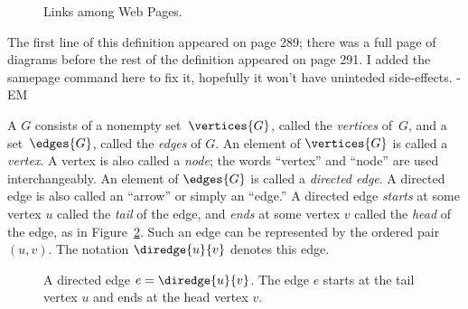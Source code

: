 \iffalse

and in the following graph the vertices $x_1, \ldots, x_n$ correspond
to web pages and $\diredge{x_i}{x_j}$ is a directed edge when page
$x_i$ contains a hyperlink to page $x_j$.
\fi


\begin{figure}


\caption{Links among Web Pages.}

\label{webpage-links}

\end{figure}
\begin{editingnotes}

The first line of this definition appeared on page 289; there was a
full page of diagrams before the rest of the definition appeared on
page 291. I added the samepage command here to fix it, hopefully it
won't have uninteded side-effects. -EM
\end{editingnotes}

\begin{samepage}
\begin{definition}\label{graphdef}
  A  $G$ consists of a nonempty
  set~$\vertices{G}$, called the \emph{vertices}%
of~$G$, and a set~$\edges{G}$, called the \emph{edges}%
of $G$.  An element of
  $\vertices{G}$ is called a \emph{vertex}.  A vertex is also called a
  \emph{node}; the words ``vertex'' and ``node'' are used
  interchangeably.  An element of $\edges{G}$ is called a
  \emph{directed edge}.  A directed edge is also called an ``arrow''
  or simply an ``edge.''  A directed edge \emph{starts} 
at some vertex $u$ called the \emph{tail}
  of the edge, and \emph{ends} at some vertex
  $v$ called the \emph{head} of the edge, as in Figure~\ref{fig:6EA}.
  Such an edge can be represented by the ordered pair $(u,v)$.  The
  notation $\diredge{u}{v}$ denotes this edge.
\end{definition}
\end{samepage}

\begin{figure}


\caption{A directed edge $e = \diredge{u}{v}$.  The edge $e$ starts at
  the tail vertex $u$ and ends at the head vertex $v$.}

\label{fig:6EA}
\end{figure}

